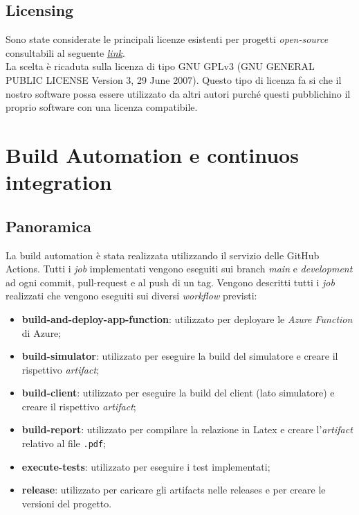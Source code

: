 \subsection{Licensing}
Sono state considerate le principali licenze esistenti per progetti \textit{open-source} consultabili al seguente \href{https://choosealicense.com/licenses/}{\textit{link}}. \\
\newline La scelta è ricaduta sulla licenza di tipo GNU GPLv3 (GNU GENERAL PUBLIC LICENSE Version 3, 29 June 2007).
Questo tipo di licenza fa si che il nostro software possa essere utilizzato da altri autori purché questi pubblichino il proprio software con una licenza compatibile.

\section{Build Automation e continuos integration}

\subsection{Panoramica}
La build automation è stata realizzata utilizzando il servizio delle GitHub Actions. Tutti i \textit{job} implementati vengono eseguiti sui branch \textit{main} e \textit{development} ad ogni commit, pull-request e al push di un tag. Vengono descritti tutti i \textit{job} realizzati che vengono eseguiti sui diversi \textit{workflow} previsti:

\begin{itemize}
    \item \textbf{build-and-deploy-app-function}: utilizzato per deployare le \textit{Azure Function} di Azure;
    
    \item \textbf{build-simulator}: utilizzato per eseguire la build del simulatore e creare il rispettivo \textit{artifact};
    
    \item \textbf{build-client}: utilizzato per eseguire la build del client (lato simulatore) e creare il rispettivo \textit{artifact};
    
    \item \textbf{build-report}: utilizzato per compilare la relazione in Latex e creare l'\textit{artifact} relativo al file \texttt{.pdf};
    
    \item \textbf{execute-tests}: utilizzato per eseguire i test implementati;
    
    \item \textbf{release}: utilizzato per caricare gli artifacts nelle releases e per creare le versioni del progetto.
    
\end{itemize}

